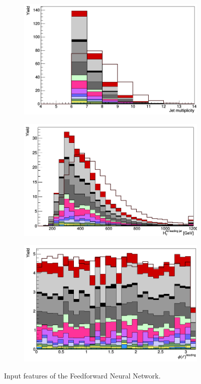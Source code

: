 \begin{figure}[H]
\begin{subfigure}{.5\textwidth}
\end{subfigure}%
\begin{subfigure}{.5\textwidth}
  \centering
  \includegraphics[width=.99\linewidth]{figs/features/nJets}
\end{subfigure}
\begin{subfigure}{.5\textwidth}
  \centering
  \includegraphics[width=.99\linewidth]{figs/features/HT_jets_noleadjet}
\end{subfigure}
\begin{subfigure}{.5\textwidth}
  \centering
  \includegraphics[width=.99\linewidth]{figs/features/lep_0_phi}
\end{subfigure}%
\caption{Input features of the Feedforward Neural Network.}
\end{figure}


